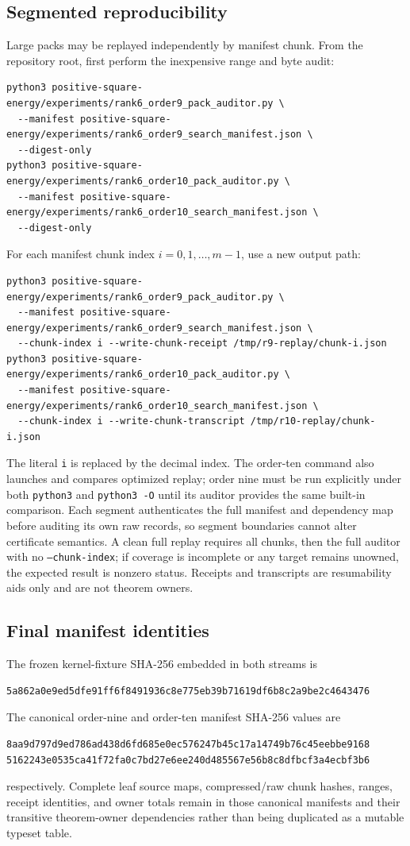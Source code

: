 \documentclass[11pt]{article}
\theoremstyle{definition}
\theoremstyle{remark}
\begin{document}
\subsection{Segmented reproducibility}

Large packs may be replayed independently by manifest chunk.  From the
repository root, first perform the inexpensive range and byte audit:
\begin{verbatim}
python3 positive-square-energy/experiments/rank6_order9_pack_auditor.py \
  --manifest positive-square-energy/experiments/rank6_order9_search_manifest.json \
  --digest-only
python3 positive-square-energy/experiments/rank6_order10_pack_auditor.py \
  --manifest positive-square-energy/experiments/rank6_order10_search_manifest.json \
  --digest-only
\end{verbatim}
For each manifest chunk index $i=0,1,\ldots,m-1$, use a new output path:
\begin{verbatim}
python3 positive-square-energy/experiments/rank6_order9_pack_auditor.py \
  --manifest positive-square-energy/experiments/rank6_order9_search_manifest.json \
  --chunk-index i --write-chunk-receipt /tmp/r9-replay/chunk-i.json
python3 positive-square-energy/experiments/rank6_order10_pack_auditor.py \
  --manifest positive-square-energy/experiments/rank6_order10_search_manifest.json \
  --chunk-index i --write-chunk-transcript /tmp/r10-replay/chunk-i.json
\end{verbatim}
The literal \texttt{i} is replaced by the decimal index.  The order-ten command
also launches and compares optimized replay; order nine must be run explicitly
under both \texttt{python3} and \texttt{python3 -O} until its auditor provides
the same built-in comparison.  Each segment authenticates the full manifest
and dependency map before auditing its own raw records, so segment boundaries
cannot alter certificate semantics.  A clean full replay requires all chunks,
then the full auditor with no \texttt{--chunk-index}; if coverage is incomplete
or any target remains unowned, the expected result is nonzero status.  Receipts
and transcripts are resumability aids only and are not theorem owners.

\subsection{Final manifest identities}

The frozen kernel-fixture SHA-256 embedded in both streams is
\begin{verbatim}
5a862a0e9ed5dfe91ff6f8491936c8e775eb39b71619df6b8c2a9be2c4643476
\end{verbatim}
The canonical order-nine and order-ten manifest SHA-256 values are
\begin{verbatim}
8aa9d797d9ed786ad438d6fd685e0ec576247b45c17a14749b76c45eebbe9168
5162243e0535ca41f72fa0c7bd27e6ee240d485567e56b8c8dfbcf3a4ecbf3b6
\end{verbatim}
respectively.  Complete leaf source maps, compressed/raw chunk hashes, ranges,
receipt identities, and owner totals remain in those canonical manifests and
their transitive theorem-owner dependencies rather than being duplicated as a
mutable typeset table.
\end{document}
